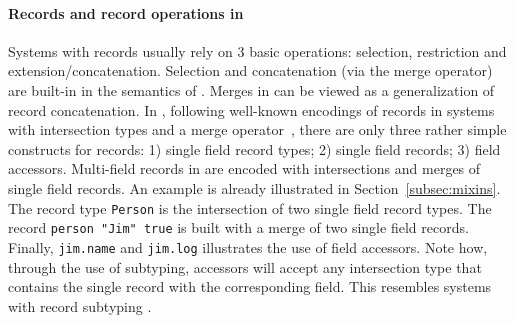 \paragraph{Records and record operations in \name}
Systems with records usually rely on 3 basic operations: selection,
restriction and extension/concatenation.  Selection and concatenation
(via the merge operator) are built-in in the semantics of
\name. Merges in \name can be viewed as a generalization of record
concatenation.  In \name, following well-known encodings of records in
systems with intersection types and a merge operator~\cite{}, there are only three rather simple constructs
for records: 1) single field record types; 2) single field records; 3)
field accessors. Multi-field records in \name are encoded with
intersections and merges of single field records. An example is
already illustrated in Section~\ref{subsec:mixins}.  The record type
\lstinline$Person$ is the intersection of two single field record
types. The record \lstinline$person "Jim" true$ is built with a merge
of two single field records. Finally, \lstinline{jim.name} and
\lstinline{jim.log} illustrates the use of field accessors.  Note how,
through the use of subtyping, accessors will accept any intersection
type that contains the single record with the corresponding field.
This resembles systems with record subtyping
\cite{cardelli1990operations,pierce1994simple}.


